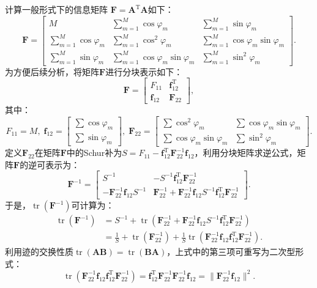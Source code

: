 计算一般形式下的信息矩阵 $\bm{F} = \bm{A}^\mathrm{T} \bm{A}$如下：
\begin{equation}
	\bm F = 
	\begin{bmatrix}
		M & \sum_{m=1}^M \cos\varphi_m & \sum_{m=1}^M \sin\varphi_m \\
		\sum_{m=1}^M \cos\varphi_m & \sum_{m=1}^M \cos^2\varphi_m & \sum_{m=1}^M \cos\varphi_m \sin\varphi_m \\
		\sum_{m=1}^M \sin\varphi_m & \sum_{m=1}^M \cos\varphi_m \sin\varphi_m & \sum_{m=1}^M \sin^2\varphi_m
	\end{bmatrix}.
\end{equation}
为方便后续分析，将矩阵$\bm{F}$进行分块表示如下：
\begin{equation}
	\bm F = 
	\begin{bmatrix}
		F_{11} & \bm f_{12}^{\mathrm T} \\
		\bm f_{12} & \bm F_{22}
	\end{bmatrix},
\end{equation}
其中：
\begin{equation}
	F_{11} = M,\;
	\bm f_{12} = \begin{bmatrix} \sum \cos\varphi_m \\ \sum \sin\varphi_m \end{bmatrix},\;
	\bm F_{22} = \begin{bmatrix} \sum \cos^2\varphi_m & \sum \cos\varphi_m \sin\varphi_m \\ \sum \cos\varphi_m \sin\varphi_m & \sum \sin^2\varphi_m \end{bmatrix}.
\end{equation}
定义$\bm{F}_{22}$在矩阵$\bm{F}$中的Schur补为$S = F_{11} - \bm{f}_{12}^{\mathrm{T}} \bm{F}_{22}^{-1} \bm{f}_{12}$，利用分块矩阵求逆公式，矩阵$\bm{F}$的逆可表示为：
\begin{equation}
	\bm{F}^{-1} =
	\begin{bmatrix}
		S^{-1} & -S^{-1} \bm{f}_{12}^{\mathrm{T}} \bm{F}_{22}^{-1} \\
		-\bm{F}_{22}^{-1}  \bm{f}_{12} S^{-1} & \bm{F}_{22}^{-1} + \bm{F}_{22}^{-1} \bm{f}_{12} S^{-1} \bm{f}_{12}^{\mathrm{T}} \bm{F}_{22}^{-1}
	\end{bmatrix}.
\end{equation}
于是，$\operatorname{tr}(\bm F^{-1})$可计算为：
\begin{align}
	\operatorname{tr}(\bm{F}^{-1}) &= S^{-1} + \operatorname{tr}\!\left( \bm{F}_{22}^{-1} + \bm{F}_{22}^{-1} \bm{f}_{12} S^{-1} \bm{f}_{12}^{\mathrm{T}} \bm{F}_{22}^{-1} \right) \\
	&= \frac{1}{S} + \operatorname{tr}(\bm{F}_{22}^{-1}) + \frac{1}{S} \operatorname{tr}\!\left( \bm{F}_{22}^{-1} \bm{f}_{12} \bm{f}_{12}^{\mathrm{T}} \bm{F}_{22}^{-1} \right). \label{eq:cdma_trFni}
\end{align}
利用迹的交换性质$\operatorname{tr}(\bm A \bm B) = \operatorname{tr}(\bm B \bm A)$，上式中的第三项可重写为二次型形式：
\begin{equation}
	\operatorname{tr}\!\left( \bm{F}_{22}^{-1} \bm{f}_{12} \bm{f}_{12}^{\mathrm{T}} \bm{F}_{22}^{-1} \right)= \bm{f}_{12}^{\mathrm{T}} \bm{F}_{22}^{-1} \bm{F}_{22}^{-1} \bm{f}_{12}= \| \bm{F}_{22}^{-1} \bm{f}_{12} \|^2.
\end{equation}

